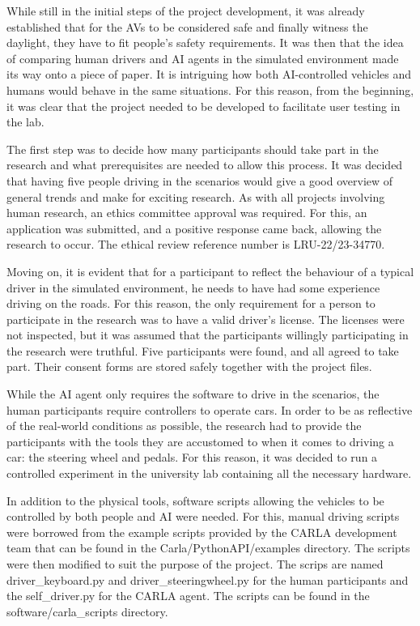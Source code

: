 While still in the initial steps of the project development, it was already established that for the AVs to be considered safe and finally witness the daylight, they have to fit people's safety requirements. It was then that the idea of comparing human drivers and AI agents in the simulated environment made its way onto a piece of paper. It is intriguing how both AI-controlled vehicles and humans would behave in the same situations. For this reason, from the beginning, it was clear that the project needed to be developed to facilitate user testing in the lab.

The first step was to decide how many participants should take part in the research and what prerequisites are needed to allow this process. It was decided that having five people driving in the scenarios would give a good overview of general trends and make for exciting research. As with all projects involving human research, an ethics committee approval was required. For this, an application was submitted, and a positive response came back, allowing the research to occur. The ethical review reference number is LRU-22/23-34770.

Moving on, it is evident that for a participant to reflect the behaviour of a typical driver in the simulated environment, he needs to have had some experience driving on the roads. For this reason, the only requirement for a person to participate in the research was to have a valid driver's license. The licenses were not inspected, but it was assumed that the participants willingly participating in the research were truthful. Five participants were found, and all agreed to take part. Their consent forms are stored safely together with the project files.

While the AI agent only requires the software to drive in the scenarios, the human participants require controllers to operate cars. In order to be as reflective of the real-world conditions as possible, the research had to provide the participants with the tools they are accustomed to when it comes to driving a car: the steering wheel and pedals. For this reason, it was decided to run a controlled experiment in the university lab containing all the necessary hardware.

In addition to the physical tools, software scripts allowing the vehicles to be controlled by both people and AI were needed. For this, manual driving scripts were borrowed from the example scripts provided by the CARLA development team that can be found in the Carla/PythonAPI/examples directory. The scripts were then modified to suit the purpose of the project. The scrips are named driver\_keyboard.py and driver\_steeringwheel.py for the human participants and the self\_driver.py for the CARLA agent. The scripts can be found in the software/carla\_scripts directory.

